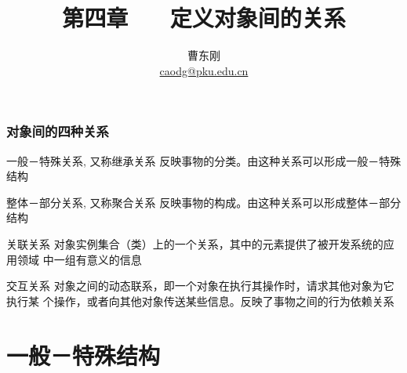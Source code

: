 \documentclass[compress]{beamer}
\begin{document}

					
\title{第四章 ~~ 定义对象间的关系 \MakeUppercase{}}

\author[面向对象的分析与设计]
{曹东刚\\\href{mailto:caodg@pku.edu.cn}{caodg@pku.edu.cn}}


\date{}



\begin{frame}[plain]
	\titlepage
\end{frame}

\setcounter{framenumber}{0}


\begin{frame}
  \frametitle{对象间的四种关系}
   {
  \begin{block}{一般－特殊关系, 又称继承关系}
    反映事物的分类。由这种关系可以形成一般－特殊结构
  \end{block}
  \begin{block}{整体－部分关系, 又称聚合关系}
    反映事物的构成。由这种关系可以形成整体－部分结构
  \end{block}
}
 {
  \begin{block}{关联关系}
    对象实例集合（类）上的一个关系，其中的元素提供了被开发系统的应用领域
    中一组有意义的信息
  \end{block}
  \begin{block}{交互关系}
    对象之间的动态联系，即一个对象在执行其操作时，请求其他对象为它执行某
    个操作，或者向其他对象传送某些信息。反映了事物之间的行为依赖关系
  \end{block}
}
\end{frame}

\section{一般－特殊结构}
\end{document}
